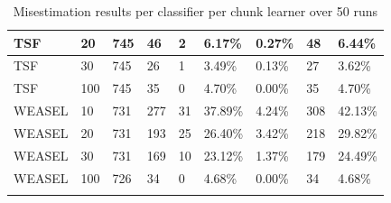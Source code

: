 \begin{landscape}
\begin{table}[hbt!]
\begin{tabularx}{\hsize}{|X|X|X|X|X|X|X|X|X|}
    TSF     & 20 & 745 & 46 & 2 & 6.17\% & 0.27\% & 48 & 6.44\% \\ \hline
    TSF     & 30 & 745 & 26 & 1 & 3.49\% & 0.13\% & 27 & 3.62\% \\ \hline
    TSF     & 100 & 745 & 35 & 0 & 4.70\% & 0.00\% & 35 & 4.70\% \\ \hline
    WEASEL  & 10 & 731 & 277 & 31 & 37.89\% & 4.24\% & 308 & 42.13\% \\ \hline
    WEASEL  & 20 & 731 & 193 & 25 & 26.40\% & 3.42\% & 218 & 29.82\% \\ \hline
    WEASEL  & 30 & 731 & 169 & 10 & 23.12\% & 1.37\% & 179 & 24.49\% \\ \hline
    WEASEL  & 100 & 726 & 34 & 0 & 4.68\% & 0.00\% & 34 & 4.68\% \\ \hline
    \caption{Misestimation results per classifier per chunk learner over 50 runs}
    \label{TableClassifierMisestimation}
  \end{tabularx}
  \end{table}
\end{landscape}